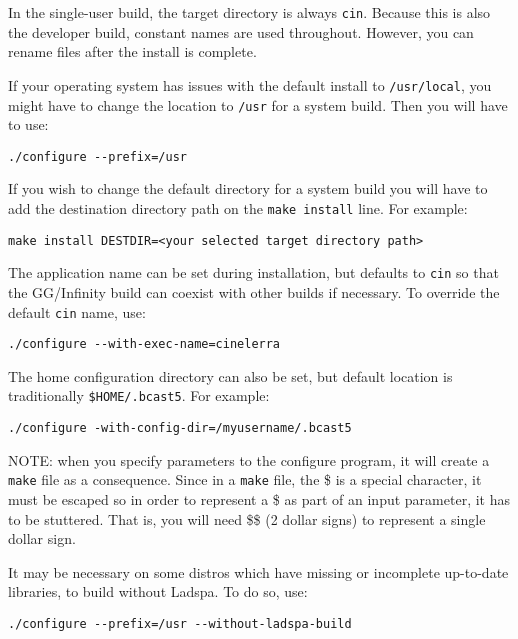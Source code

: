 In the single-user build, the target directory is always
\texttt{cin}.  Because this is also the developer build, constant
names are used throughout.  However, you can rename files after the
install is complete.

If your operating system has issues with the default install to
\texttt{/usr/local}, you might have to change the location to
\texttt{/usr} for a system build.  Then you will have to use:
\begin{lstlisting}[style=sh]
./configure --prefix=/usr
\end{lstlisting}

If you wish to change the default directory for a system build you
will have to add the destination directory path on the \texttt{make
  install} line.  For example:
\begin{lstlisting}[style=sh]
make install DESTDIR=<your selected target directory path>
\end{lstlisting}

The application name can be set during installation, but defaults to
\texttt{cin} so that the GG/Infinity build can coexist with other
\CGG{} builds if necessary.  To override the default \texttt{cin}
name, use:
\begin{lstlisting}[style=sh]
./configure --with-exec-name=cinelerra
\end{lstlisting}

The home configuration directory can also be set, but default
location is traditionally \texttt{\$HOME/.bcast5}.  For example:

\begin{lstlisting}[style=sh]
./configure -with-config-dir=/myusername/.bcast5
\end{lstlisting}

NOTE: when you specify parameters to the configure program, it will
create a \texttt{make} file as a consequence.  Since in a
\texttt{make} file, the \$ is a special character, it must be
escaped so in order to represent a \$ as part of an input parameter,
it has to be stuttered.  That is, you will need \$\$ (2 dollar
signs) to represent a single dollar sign.

It may be necessary on some distros which have missing or incomplete
up-to-date libraries, to build \CGG{} without Ladspa.  To do so,
use:

\begin{lstlisting}[style=sh]
./configure --prefix=/usr --without-ladspa-build
\end{lstlisting}

